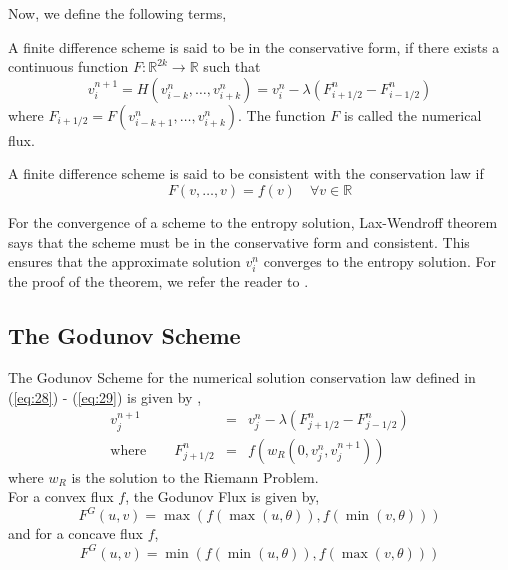 \noindent
Now, we define the following terms,
\begin{definition}
	A finite difference scheme is said to be in the conservative form, if there exists a continuous function $F: \mathbb{R}^{2k} \to \mathbb{R}$ such that
	\begin{equation}
		v_i^{n+1} = H(v_{i-k}^n, \dots,v_{i+k}^n) = v_i^n - \lambda \left(F_{i+1/2}^n - F_{i-1/2}^n\right)\label{eq:27}
	\end{equation}
	where $F_{i+1/2} = F(v_{i-k+1}^n, \dots, v_{i+k}^n )$. The function $F$ is called the numerical flux.
\end{definition}
\begin{definition}
	A finite difference scheme is said to be consistent with the conservation law if 
	\begin{equation}
		F(v,\dots,v) = f(v) \quad \forall v \in \mathbb{R}
	\end{equation}
\end{definition}

\noindent
For the convergence of a scheme to the entropy solution, Lax-Wendroff theorem\cite{gowda} says that the scheme must be in the conservative form and consistent. This ensures that the approximate solution $v_i^n$ converges to the entropy solution. For the proof of the theorem, we refer the reader to \cite{gowda}.

\subsection{The Godunov Scheme}
The Godunov Scheme for the numerical solution conservation law defined in (\ref{eq:28}) - (\ref{eq:29}) is given by \cite{gowda,leve},
\begin{eqnarray}
	v_j^{n+1} &=& v_j^{n} - \lambda \left(F^n_{j+1/2} - F^n_{j-1/2}\right)\label{conlaw}\\
	\text{where} \qquad F^n_{j+1/2} &=& f(w_R(0,v_j^n,v_j^{n+1}))
\end{eqnarray}
where $w_R$ is the solution to the Riemann Problem.\\

\noindent
For a convex flux $f$, the Godunov Flux is given by,
\begin{equation}
	F^G(u,v) = \max(f(\max(u,\theta)), f(\min(v,\theta))) \label{godunov}
\end{equation}
and for a concave flux $f$,
\begin{equation}
	F^G(u,v) = \min(f(\min(u,\theta)), f(\max(v,\theta)))
\end{equation}


